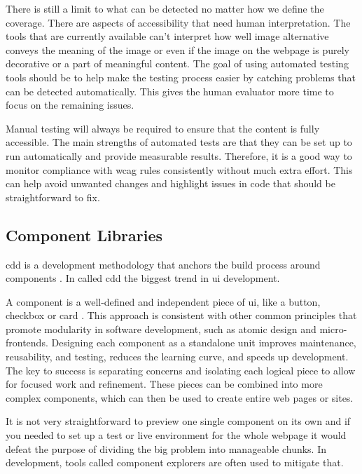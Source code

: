 \documentclass{master_thesis}
\begin{document}
There is still a limit to what can be detected no matter how we define the coverage. There are aspects of accessibility that need human interpretation. The tools that are currently available can't interpret how well image alternative conveys the meaning of the image or even if the image on the webpage is purely decorative or a part of meaningful content. The goal of using automated testing tools should be to help make the testing process easier by catching problems that can be detected automatically. This gives the human evaluator more time to focus on the remaining issues.

Manual testing will always be required to ensure that the content is fully accessible. The main strengths of automated tests are that they can be set up to run automatically and provide measurable results. Therefore, it is a good way to monitor compliance with \ac{wcag} rules consistently without much extra effort. This can help avoid unwanted changes and highlight issues in code that should be straightforward to fix.

\subsection{Component Libraries}


\ac{cdd} is a development methodology that anchors the build process around components \citep{Coleman2017}. In \citeyear{Coleman2017} \citeauthor{Coleman2017} called \ac{cdd} the biggest trend in \ac{ui} development.

A component is a well-defined and independent piece of \ac{ui}, like a button, checkbox or card \citep{Ella2019}. This approach is consistent with other common principles that promote modularity in software development, such as atomic design and micro-frontends. Designing each component as a standalone unit improves maintenance, reusability, and testing, reduces the learning curve, and speeds up development. The key to success is separating concerns and isolating each logical piece to allow for focused work and refinement. These pieces can be combined into more complex components, which can then be used to create entire web pages or sites.

It is not very straightforward to preview one single component on its own and if you needed to set up a test or live environment for the whole webpage it would defeat the purpose of dividing the big problem into manageable chunks. In development, tools called component explorers are often used to mitigate that.
\end{document}
